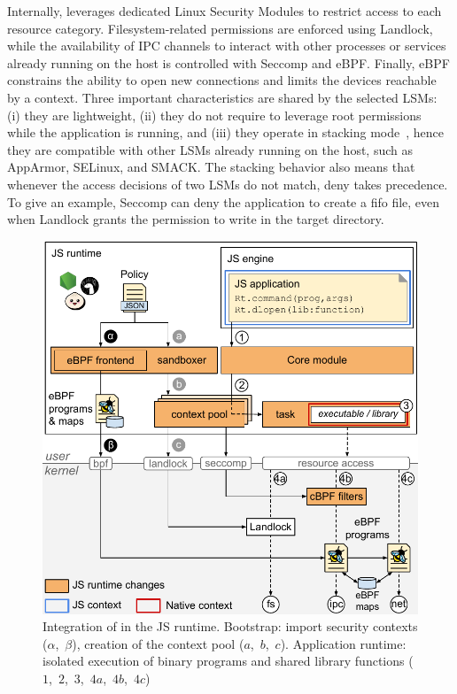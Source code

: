 Internally, \natisand leverages dedicated Linux Security Modules to
restrict access to each resource category.  Filesystem-related
permissions are enforced using Landlock, while the availability of IPC
channels to interact with other processes or services already running
on the host is controlled with Seccomp and eBPF. Finally, eBPF constrains the ability
to open new connections and limits the devices reachable by a context.
Three important characteristics are
shared by the selected LSMs: (i) they are lightweight, (ii) they do
not require to leverage root permissions while the application is
running, and (iii) they operate in stacking
mode~\cite{smalley2001implementing}, hence they are
compatible with other LSMs already running on the host, such as
AppArmor, SELinux, and SMACK. The stacking behavior also means that
whenever the access decisions of two LSMs do not match, deny takes
precedence. To give an example, Seccomp can deny the application to
create a fifo file, even when Landlock grants the permission to write
in the target directory.

\begin{figure}[t]
  \includegraphics[width=\columnwidth]{chapters/natisand/fig/overview_sandbox}
  \caption[Integration of \natisand in JS runtimes]{
    Integration of \natisand in the JS runtime. Bootstrap: import
    security contexts ($\alpha$,~$\beta$), creation of the context
    pool ($a$,~$b$,~$c$). Application runtime: isolated execution of
    binary programs and shared library functions
    ($1$,~$2$,~$3$,~$4a$,~$4b$,~$4c$)
  }
  \label{fig:overview_sandbox}
\end{figure}
      
